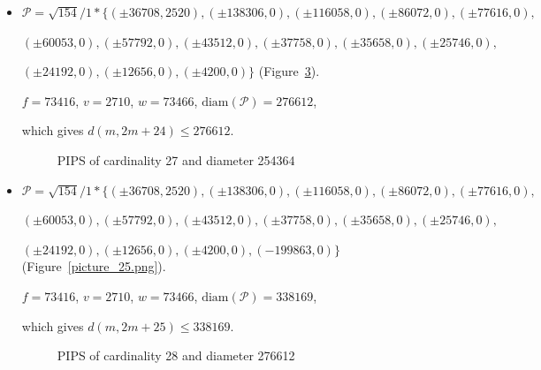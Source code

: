 \documentclass[12pt]{article}
\theoremstyle{theorem}
\theoremstyle{dfn}
\theoremstyle{remark}
\begin{document}
\begin{itemize}
$
(\pm 12656 , 0),
(\pm 4200 , 0),
(-138306 , 0)\}
$
(Figure~\ref{picture_23.png}).

$f = 73416$, $v = 2710$, $w = 73466$, $\operatorname{diam(\mathcal{P})} = 254364$,

which gives $d(m, 2m + 23) \leq 254364$.


\begin{figure}[h!]
\parbox{1\linewidth}{\caption{PIPS of cardinality 26 and diameter 39516}
\label{picture_22.png}}
\end{figure}


\item
$\mathcal{P}=\sqrt{154}/{1} * \{ (\pm 36708, 2520),
(\pm 138306 , 0),
(\pm 116058 , 0),
(\pm 86072 , 0),
(\pm 77616 , 0),
$

$
(\pm 60053 , 0),
(\pm 57792 , 0),
(\pm 43512 , 0),
(\pm 37758 , 0),
(\pm 35658 , 0),
(\pm 25746 , 0),
$

$
(\pm 24192 , 0),
(\pm 12656 , 0),
(\pm 4200 , 0)\}
$
(Figure~\ref{picture_24.png}).

$f = 73416$, $v = 2710$, $w = 73466$, $\operatorname{diam(\mathcal{P})} = 276612$,

which gives $d(m, 2m + 24) \leq 276612$.


\begin{figure}[h!]
\parbox{1\linewidth}{\caption{PIPS of cardinality 27 and diameter 254364}
\label{picture_23.png}}
\end{figure}


\item
$\mathcal{P}=\sqrt{154}/{1} * \{ (\pm 36708, 2520),
(\pm 138306 , 0),
(\pm 116058 , 0),
(\pm 86072 , 0),
(\pm 77616 , 0),
$

$
(\pm 60053 , 0),
(\pm 57792 , 0),
(\pm 43512 , 0),
(\pm 37758 , 0),
(\pm 35658 , 0),
(\pm 25746 , 0),
$

$
(\pm 24192 , 0),
(\pm 12656 , 0),
(\pm 4200 , 0),
(-199863 , 0)\}
$
(Figure~\ref{picture_25.png}).

$f = 73416$, $v = 2710$, $w = 73466$, $\operatorname{diam(\mathcal{P})} = 338169$,

which gives $d(m, 2m + 25) \leq 338169$.


\begin{figure}[h!]
\parbox{1\linewidth}{\caption{PIPS of cardinality 28 and diameter 276612}
\label{picture_24.png}}
\end{figure}



\end{itemize}
\end{document}
